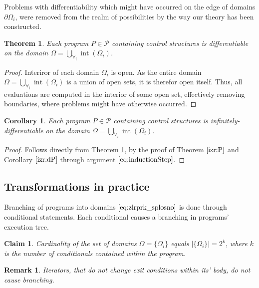 \documentclass{article}
\newcommand{\dP}{\mathcal{P}}
\DeclareMathOperator{\interior}{int}
\newtheorem{trditev}{Claim}[section]
\newtheorem{izrek}{Theorem}[section]
\newtheorem{opomba}{Remark}[section]
\newtheorem{corollary}{Corollary}[section]
\begin{document}
 Problems with differentiability which might have occurred on the edge of domains $\partial\Omega_i$, were removed from the realm of possibilities by the way our theory has been constructed.


 \begin{izrek}\label{izr:diferentiableOnDomain}
 Each program $P\in\dP$ containing control structures is differentiable on the domain $\Omega=\bigcup\limits_{\forall_i}\interior(\Omega_i)$.
 \end{izrek}
 \begin{proof}
  Interiror of each domain $\Omega_i$ is open. As the entire domain $\Omega=\bigcup\limits_{\forall_i}\interior(\Omega_i)$ is a union of open sets, it is therefor open itself. Thus, all evaluations are computed in the interior of some open set, effectively removing boundaries, where problems might have otherwise occurred.
 \end{proof}
 
 \begin{corollary}
\label{izr:infDiferentiableOnDomain}
  Each program $P\in\dP$ containing control structures is infinitely-differentiable on the domain $\Omega=\bigcup\limits_{\forall_i}\interior(\Omega_i)$.
 \end{corollary}
 \begin{proof}
 Follows directly from Theorem \ref{izr:diferentiableOnDomain}, by the proof of Theorem $\ref{izr:P}$ and Corollary $\ref{izr:dP}$ through argument $\eqref{eq:inductionStep}$.
 \end{proof}

\subsection{Transformations in practice} \label{sec:TransInPractice}

Branching of programs into domains $\eqref{eq:zlrprk_splosno}$ is done through conditional statements. Each conditional causes a branching in programs' execution tree.

\begin{trditev}\label{izr:st.zlepkov}
Cardinality of the set of domains $\Omega=\{\Omega_i\}$ equals $\lvert\{\Omega_i \}\rvert=2^k$, where $k$ is the number of conditionals contained within the program.
\end{trditev}
\begin{opomba}
Iterators, that do not change exit conditions within its' body, do not cause branching.
\end{opomba}
\end{document}
